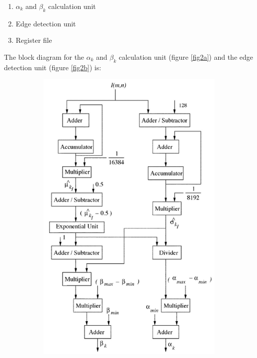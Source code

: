\documentclass[letterpaper, 11pt]{article}
\begin{document}
	\begin{enumerate}
		\item $\alpha_k$ and $\beta_k$ calculation unit
		\item Edge detection unit
		\item Register file
	\end{enumerate}
	
	The block diagram for the $\alpha_k$ and $\beta_k$ calculation unit (figure \ref{fig2a}) and the edge detection unit (figure \ref{fig2b}) is:
	
	\begin{figure}[ht!]
		\centering
		\begin{subfigure}[b]{.35\linewidth}
			\includegraphics[width=\textwidth]{report_pics/ak_bk_unit_block_diagram.png}

\end{subfigure}
\end{figure}
\end{document}
